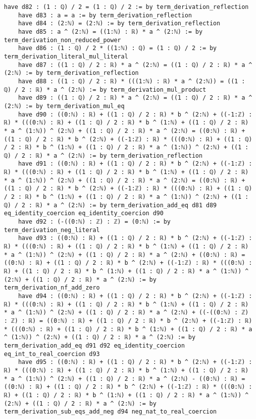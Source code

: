 \documentclass{article}
\begin{document}
\begin{tcolorbox}[colback=white!10, width=\linewidth]
\begin{lstlisting}[language=Lean4]
    have d82 : (1 : ℚ) / 2 = (1 : ℚ) / 2 := by term_derivation_reflection
    have d83 : a = a := by term_derivation_reflection
    have d84 : (2:ℕ) = (2:ℕ) := by term_derivation_reflection
    have d85 : a ^ (2:ℕ) = ((1:ℕ) : ℝ) * a ^ (2:ℕ) := by term_derivation_non_reduced_power
    have d86 : (1 : ℚ) / 2 * ((1:ℕ) : ℚ) = (1 : ℚ) / 2 := by term_derivation_literal_mul_literal
    have d87 : ((1 : ℚ) / 2 : ℝ) * a ^ (2:ℕ) = ((1 : ℚ) / 2 : ℝ) * a ^ (2:ℕ) := by term_derivation_reflection
    have d88 : ((1 : ℚ) / 2 : ℝ) * (((1:ℕ) : ℝ) * a ^ (2:ℕ)) = ((1 : ℚ) / 2 : ℝ) * a ^ (2:ℕ) := by term_derivation_mul_product
    have d89 : ((1 : ℚ) / 2 : ℝ) * a ^ (2:ℕ) = ((1 : ℚ) / 2 : ℝ) * a ^ (2:ℕ) := by term_derivation_mul_eq
    have d90 : ((0:ℕ) : ℝ) + ((1 : ℚ) / 2 : ℝ) * b ^ (2:ℕ) + ((-1:ℤ) : ℝ) * (((0:ℕ) : ℝ) + ((1 : ℚ) / 2 : ℝ) * b ^ (1:ℕ) + ((1 : ℚ) / 2 : ℝ) * a ^ (1:ℕ)) ^ (2:ℕ) + ((1 : ℚ) / 2 : ℝ) * a ^ (2:ℕ) = ((0:ℕ) : ℝ) + ((1 : ℚ) / 2 : ℝ) * b ^ (2:ℕ) + ((-1:ℤ) : ℝ) * (((0:ℕ) : ℝ) + ((1 : ℚ) / 2 : ℝ) * b ^ (1:ℕ) + ((1 : ℚ) / 2 : ℝ) * a ^ (1:ℕ)) ^ (2:ℕ) + ((1 : ℚ) / 2 : ℝ) * a ^ (2:ℕ) := by term_derivation_reflection
    have d91 : ((0:ℕ) : ℝ) + ((1 : ℚ) / 2 : ℝ) * b ^ (2:ℕ) + ((-1:ℤ) : ℝ) * (((0:ℕ) : ℝ) + ((1 : ℚ) / 2 : ℝ) * b ^ (1:ℕ) + ((1 : ℚ) / 2 : ℝ) * a ^ (1:ℕ)) ^ (2:ℕ) + ((1 : ℚ) / 2 : ℝ) * a ^ (2:ℕ) = ((0:ℕ) : ℝ) + ((1 : ℚ) / 2 : ℝ) * b ^ (2:ℕ) + ((-1:ℤ) : ℝ) * (((0:ℕ) : ℝ) + ((1 : ℚ) / 2 : ℝ) * b ^ (1:ℕ) + ((1 : ℚ) / 2 : ℝ) * a ^ (1:ℕ)) ^ (2:ℕ) + ((1 : ℚ) / 2 : ℝ) * a ^ (2:ℕ) := by term_derivation_add_eq d81 d89 eq_identity_coercion eq_identity_coercion d90
    have d92 : (-((0:ℕ) : ℤ) : ℤ) = (0:ℕ) := by term_derivation_neg_literal
    have d93 : ((0:ℕ) : ℝ) + ((1 : ℚ) / 2 : ℝ) * b ^ (2:ℕ) + ((-1:ℤ) : ℝ) * (((0:ℕ) : ℝ) + ((1 : ℚ) / 2 : ℝ) * b ^ (1:ℕ) + ((1 : ℚ) / 2 : ℝ) * a ^ (1:ℕ)) ^ (2:ℕ) + ((1 : ℚ) / 2 : ℝ) * a ^ (2:ℕ) + ((0:ℕ) : ℝ) = ((0:ℕ) : ℝ) + ((1 : ℚ) / 2 : ℝ) * b ^ (2:ℕ) + ((-1:ℤ) : ℝ) * (((0:ℕ) : ℝ) + ((1 : ℚ) / 2 : ℝ) * b ^ (1:ℕ) + ((1 : ℚ) / 2 : ℝ) * a ^ (1:ℕ)) ^ (2:ℕ) + ((1 : ℚ) / 2 : ℝ) * a ^ (2:ℕ) := by term_derivation_nf_add_zero
    have d94 : ((0:ℕ) : ℝ) + ((1 : ℚ) / 2 : ℝ) * b ^ (2:ℕ) + ((-1:ℤ) : ℝ) * (((0:ℕ) : ℝ) + ((1 : ℚ) / 2 : ℝ) * b ^ (1:ℕ) + ((1 : ℚ) / 2 : ℝ) * a ^ (1:ℕ)) ^ (2:ℕ) + ((1 : ℚ) / 2 : ℝ) * a ^ (2:ℕ) + ((-((0:ℕ) : ℤ) : ℤ) : ℝ) = ((0:ℕ) : ℝ) + ((1 : ℚ) / 2 : ℝ) * b ^ (2:ℕ) + ((-1:ℤ) : ℝ) * (((0:ℕ) : ℝ) + ((1 : ℚ) / 2 : ℝ) * b ^ (1:ℕ) + ((1 : ℚ) / 2 : ℝ) * a ^ (1:ℕ)) ^ (2:ℕ) + ((1 : ℚ) / 2 : ℝ) * a ^ (2:ℕ) := by term_derivation_add_eq d91 d92 eq_identity_coercion eq_int_to_real_coercion d93
    have d95 : ((0:ℕ) : ℝ) + ((1 : ℚ) / 2 : ℝ) * b ^ (2:ℕ) + ((-1:ℤ) : ℝ) * (((0:ℕ) : ℝ) + ((1 : ℚ) / 2 : ℝ) * b ^ (1:ℕ) + ((1 : ℚ) / 2 : ℝ) * a ^ (1:ℕ)) ^ (2:ℕ) + ((1 : ℚ) / 2 : ℝ) * a ^ (2:ℕ) - ((0:ℕ) : ℝ) = ((0:ℕ) : ℝ) + ((1 : ℚ) / 2 : ℝ) * b ^ (2:ℕ) + ((-1:ℤ) : ℝ) * (((0:ℕ) : ℝ) + ((1 : ℚ) / 2 : ℝ) * b ^ (1:ℕ) + ((1 : ℚ) / 2 : ℝ) * a ^ (1:ℕ)) ^ (2:ℕ) + ((1 : ℚ) / 2 : ℝ) * a ^ (2:ℕ) := by term_derivation_sub_eqs_add_neg d94 neg_nat_to_real_coercion

\end{lstlisting}
\end{tcolorbox}
\end{document}
